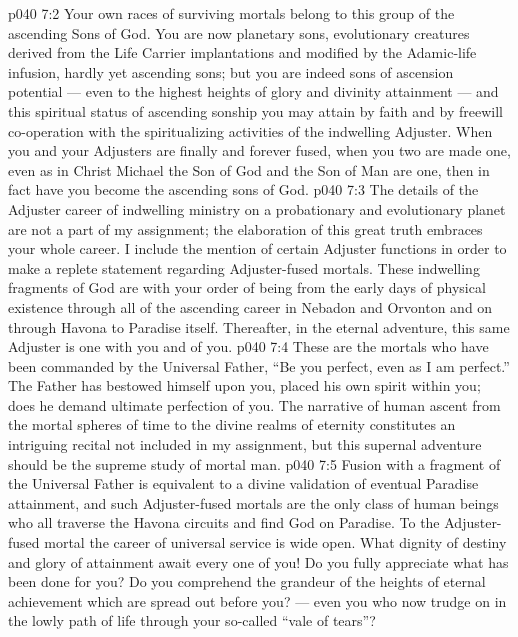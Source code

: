 \vs p040 7:2 Your own races of surviving mortals belong to this group of the ascending Sons of God. You are now planetary sons, evolutionary creatures derived from the Life Carrier implantations and modified by the Adamic\hyp{}life infusion, hardly yet ascending sons; but you are indeed sons of ascension potential --- even to the highest heights of glory and divinity attainment --- and this spiritual status of ascending sonship you may attain by faith and by freewill co\hyp{}operation with the spiritualizing activities of the indwelling Adjuster. When you and your Adjusters are finally and forever fused, when you two are made one, even as in Christ Michael the Son of God and the Son of Man are one, then in fact have you become the ascending sons of God.
\vs p040 7:3 The details of the Adjuster career of indwelling ministry on a probationary and evolutionary planet are not a part of my assignment; the elaboration of this great truth embraces your whole career. I include the mention of certain Adjuster functions in order to make a replete statement regarding Adjuster\hyp{}fused mortals. These indwelling fragments of God are with your order of being from the early days of physical existence through all of the ascending career in Nebadon and Orvonton and on through Havona to Paradise itself. Thereafter, in the eternal adventure, this same Adjuster is one with you and of you.
\vs p040 7:4 These are the mortals who have been commanded by the Universal Father, “Be you perfect, even as I am perfect.” The Father has bestowed himself upon you, placed his own spirit within you;  does he demand ultimate perfection of you. The narrative of human ascent from the mortal spheres of time to the divine realms of eternity constitutes an intriguing recital not included in my assignment, but this supernal adventure should be the supreme study of mortal man.
\vs p040 7:5 Fusion with a fragment of the Universal Father is equivalent to a divine validation of eventual Paradise attainment, and such Adjuster\hyp{}fused mortals are the only class of human beings who all traverse the Havona circuits and find God on Paradise. To the Adjuster\hyp{}fused mortal the career of universal service is wide open. What dignity of destiny and glory of attainment await every one of you! Do you fully appreciate what has been done for you? Do you comprehend the grandeur of the heights of eternal achievement which are spread out before you? --- even you who now trudge on in the lowly path of life through your so\hyp{}called “vale of tears”?
